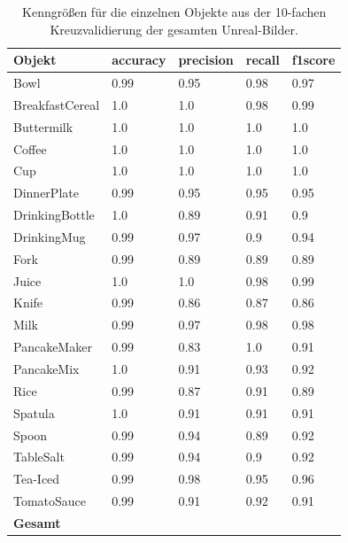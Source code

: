 \begin{table}
\begin{tabularx}{\textwidth}{Xllll}
\textbf{Objekt}	& \textbf{\gls{accuracy}} & \textbf{\gls{precision}}	& \textbf{\gls{recall}}	& \textbf{\gls{f1score}} \\ \hline
Bowl & 0.99 & 0.95 & 0.98 & 0.97 \\  
BreakfastCereal & 1.0 & 1.0 & 0.98 & 0.99 \\  
Buttermilk & 1.0 & 1.0 & 1.0 & 1.0 \\  
Coffee & 1.0 & 1.0 & 1.0 & 1.0 \\  
Cup & 1.0 & 1.0 & 1.0 & 1.0 \\  
DinnerPlate & 0.99 & 0.95 & 0.95 & 0.95 \\  
DrinkingBottle & 1.0 & 0.89 & 0.91 & 0.9 \\  
DrinkingMug & 0.99 & 0.97 & 0.9 & 0.94 \\  
Fork & 0.99 & 0.89 & 0.89 & 0.89 \\  
Juice & 1.0 & 1.0 & 0.98 & 0.99 \\  
Knife & 0.99 & 0.86 & 0.87 & 0.86 \\  
Milk & 0.99 & 0.97 & 0.98 & 0.98 \\  
PancakeMaker & 0.99 & 0.83 & 1.0 & 0.91 \\  
PancakeMix & 1.0 & 0.91 & 0.93 & 0.92 \\  
Rice & 0.99 & 0.87 & 0.91 & 0.89 \\  
Spatula & 1.0 & 0.91 & 0.91 & 0.91 \\  
Spoon & 0.99 & 0.94 & 0.89 & 0.92 \\  
TableSalt & 0.99 & 0.94 & 0.9 & 0.92 \\  
Tea-Iced & 0.99 & 0.98 & 0.95 & 0.96 \\  
TomatoSauce & 0.99 & 0.91 & 0.92 & 0.91 \\  \hline
\textbf{Gesamt}		&	   &	  &      &       \\ 
\end{tabularx}
\caption[Objekt-spezifische Kenngrößen des gesamten Unreal-Bilder Datensatzes]{Kenngrößen für die einzelnen Objekte aus der 10-fachen Kreuzvalidierung der gesamten Unreal-Bilder.}
\label{tab:UnrealGTClass_metrics}
\end{table}


